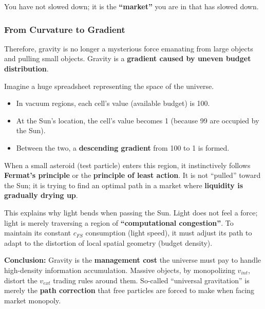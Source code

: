 You have not slowed down; it is the \textbf{``market''} you are in that has slowed down.

\subsubsection{From Curvature to Gradient}

Therefore, gravity is no longer a mysterious force emanating from large objects and pulling small objects. Gravity is a \textbf{gradient caused by uneven budget distribution}.

Imagine a huge spreadsheet representing the space of the universe.

\begin{itemize}
\item In vacuum regions, each cell's value (available budget) is 100.

\item At the Sun's location, the cell's value becomes 1 (because 99 are occupied by the Sun).

\item Between the two, a \textbf{descending gradient} from 100 to 1 is formed.
\end{itemize}

When a small asteroid (test particle) enters this region, it instinctively follows \textbf{Fermat's principle} or the \textbf{principle of least action}. It is not ``pulled'' toward the Sun; it is trying to find an optimal path in a market where \textbf{liquidity is gradually drying up}.

This explains why light bends when passing the Sun. Light does not feel a force; light is merely traversing a region of \textbf{``computational congestion''}. To maintain its constant $c_{FS}$ consumption (light speed), it must adjust its path to adapt to the distortion of local spatial geometry (budget density).

\textbf{Conclusion:} Gravity is the \textbf{management cost} the universe must pay to handle high-density information accumulation. Massive objects, by monopolizing $v_{int}$, distort the $v_{ext}$ trading rules around them. So-called ``universal gravitation'' is merely the \textbf{path correction} that free particles are forced to make when facing market monopoly.

